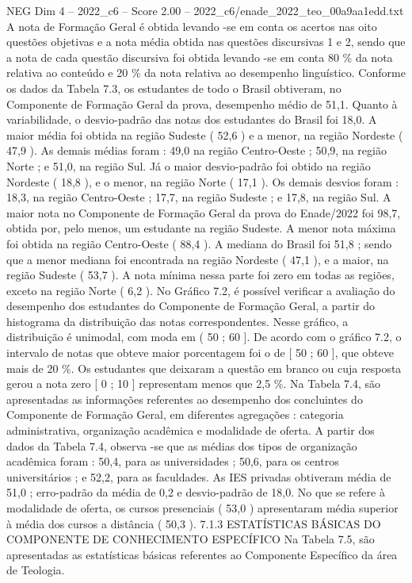\begin{textsample}{NEG Dim 4 – 2022\_c6 – Score 2.00 – 2022\_c6/enade\_2022\_teo\_00a9aa1edd.txt}
A nota de Formação Geral é obtida levando -se em conta os acertos nas oito questões objetivas e a nota média obtida nas questões discursivas 1 e 2, sendo que a nota de cada questão discursiva foi obtida levando -se em conta 80 \% da nota relativa ao conteúdo e 20 \% da nota relativa ao desempenho linguístico.
Conforme os dados da Tabela 7.3, os estudantes de todo o Brasil obtiveram, no Componente de Formação Geral da prova, desempenho médio de 51,1.
Quanto à variabilidade, o desvio-padrão das notas dos estudantes do Brasil foi 18,0.
A maior média foi obtida na região Sudeste ( 52,6 ) e a menor, na região Nordeste ( 47,9 ).
As demais médias foram : 49,0 na região Centro-Oeste ; 50,9, na região Norte ; e 51,0, na região Sul.
Já o maior desvio-padrão foi obtido na região Nordeste ( 18,8 ), e o menor, na região Norte ( 17,1 ).
Os demais desvios foram : 18,3, na região Centro-Oeste ; 17,7, na região Sudeste ; e 17,8, na região Sul.
A maior nota no Componente de Formação Geral da prova do Enade/2022 foi 98,7, obtida por, pelo menos, um estudante na região Sudeste.
A menor nota máxima foi obtida na região Centro-Oeste ( 88,4 ).
A mediana do Brasil foi 51,8 ; sendo que a menor mediana foi encontrada na região Nordeste ( 47,1 ), e a maior, na região Sudeste ( 53,7 ).
A nota mínima nessa parte foi zero em todas as regiões, exceto na região Norte ( 6,2 ).
No Gráfico 7.2, é possível verificar a avaliação do desempenho dos estudantes do Componente de Formação Geral, a partir do histograma da distribuição das notas correspondentes.
Nesse gráfico, a distribuição é unimodal, com moda em ( 50 ; 60 ].
De acordo com o gráfico 7.2, o intervalo de notas que obteve maior porcentagem foi o de [ 50 ; 60 ], que obteve mais de 20 \%.
Os estudantes que deixaram a questão em branco ou cuja resposta gerou a nota zero [ 0 ; 10 ] representam menos que 2,5 \%.
Na Tabela 7.4, são apresentadas as informações referentes ao desempenho dos concluintes do Componente de Formação Geral, em diferentes agregações : categoria administrativa, organização acadêmica e modalidade de oferta.
A partir dos dados da Tabela 7.4, observa -se que as médias dos tipos de organização acadêmica foram : 50,4, para as universidades ; 50,6, para os centros universitários ; e 52,2, para as faculdades.
As IES privadas obtiveram média de 51,0 ; erro-padrão da média de 0,2 e desvio-padrão de 18,0.
No que se refere à modalidade de oferta, os cursos presenciais ( 53,0 ) apresentaram média superior à média dos cursos a distância ( 50,3 ). 7.1.3 ESTATÍSTICAS BÁSICAS DO COMPONENTE DE CONHECIMENTO ESPECÍFICO Na Tabela 7.5, são apresentadas as estatísticas básicas referentes ao Componente Específico da área de Teologia.

\end{textsample}
